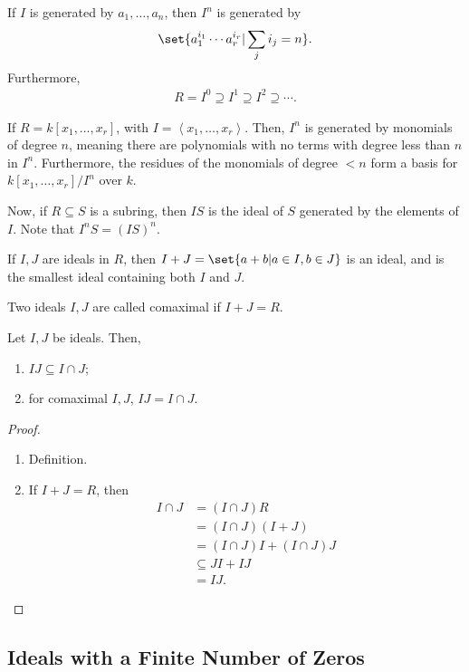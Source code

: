 \documentclass[10pt]{mypackage}
\begin{document}
If $I$ is generated by $a_1,\dots,a_n$, then $I^{n}$ is generated by
\begin{align*}
  \set{a_1^{i_1}\cdots a_r^{i_r} | \sum_{j}i_j = n}.
\end{align*}
Furthermore,
\begin{align*}
  R= I^0\supseteq I^1\supseteq I^2\supseteq \cdots.
\end{align*}
\begin{example}
  If $R = k\left[ x_1,\dots,x_r \right]$, with $I = \left\langle x_1,\dots,x_r \right\rangle$. Then, $I^n$ is generated by monomials of degree $n$, meaning there are polynomials with no terms with degree less than $n$ in $I^n$. Furthermore, the residues of the monomials of degree $< n$ form a basis for $k\left[ x_1,\dots,x_r \right]/I^n$ over $k$.
\end{example}
Now, if $R\subseteq S$ is a subring, then $IS$ is the ideal of $S$ generated by the elements of $I$. Note that $I^{n}S = \left( IS \right)^{n}$.\newline

If $I,J$ are ideals in $R$, then $I+J = \set{a + b | a\in I,b\in J}$ is an ideal, and is the smallest ideal containing both $I$ and $J$.\newline

Two ideals $I,J$ are called comaximal if $I + J = R$.
\begin{lemma}
  Let $I,J$ be ideals. Then,
  \begin{enumerate}[(1)]
    \item $IJ\subseteq I\cap J$;
    \item for comaximal $I,J$, $IJ = I\cap J$.
  \end{enumerate}
\end{lemma}
\begin{proof}\hfill
  \begin{enumerate}[(1)]
    \item Definition.
    \item If $I + J = R$, then
      \begin{align*}
        I\cap J &= \left( I\cap J \right) R\\
                &= \left( I\cap J \right)\left(  I + J \right)\\
                &= \left( I\cap J \right)I + \left( I\cap J \right)J\\
                &\subseteq JI + IJ\\
                &= IJ.
      \end{align*}
  \end{enumerate}
\end{proof}

\subsection{Ideals with a Finite Number of Zeros}%
\end{document}
